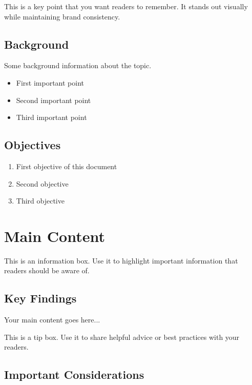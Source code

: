 \documentclass[11pt, a4paper]{article}
\begin{document}
\begin{keypoint}
    This is a key point that you want readers to remember. It stands out visually while maintaining brand consistency.
\end{keypoint}

\subsection{Background}

Some background information about the topic.

\begin{itemize}
    \item First important point
    \item Second important point
    \item Third important point
\end{itemize}

\subsection{Objectives}

\begin{enumerate}
    \item First objective of this document
    \item Second objective
    \item Third objective
\end{enumerate}

\section{Main Content}

\begin{infobox}
    This is an information box. Use it to highlight important information that readers should be aware of.
\end{infobox}

\subsection{Key Findings}

Your main content goes here...

\begin{tipbox}
    This is a tip box. Use it to share helpful advice or best practices with your readers.
\end{tipbox}

\subsection{Important Considerations}
\end{document}
